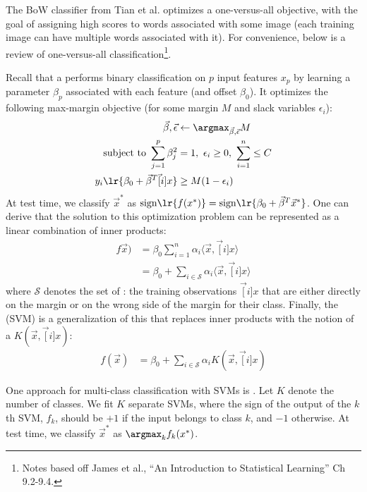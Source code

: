 \documentclass[11pt]{article}
\begin{document}
The BoW classifier from Tian et al. optimizes a one-versus-all objective, with the goal of assigning high scores to words associated with some image (each training image can have multiple words associated with it). For convenience, below is a review of one-versus-all classification\footnote{Notes based off James et al., ``An Introduction to Statistical Learning'' Ch 9.2-9.4.}.
\begin{example}
	Recall that a  performs binary classification on $p$ input features $x_p$ by learning a parameter $\beta_p$ associated with each feature (and offset $\beta_0$). It optimizes the following max-margin objective (for some margin $M$ and slack variables $\epsilon_i$):
	\begin{align}
		\vec{\beta}, \vec{\epsilon}
		&\leftarrow \argmax_{\vec \beta, \vec \epsilon} M \\
		\text{subject to } \sum_{j=1}^{p} \beta_j^2
		&= 1
		,~ \epsilon_i \geq 0
		,~ \sum_{i=1}^{n} \leq C \\
		y_i \lr{ \beta_0 + \vec{\beta}^T\vec[i]{x} }
		&\geq M(1 - \epsilon_i)
	\end{align}
	At test time, we classify $\vec{x}^*$ as $\text{sign} \lr{ f(x^*) } = \text{sign}\lr{ \beta_0 + \vec{\beta}^T \vec{x}^*}$. One can derive that the solution to this optimization problem can be represented as a linear combination of inner products:
	\begin{align}
		f\vec x) 
		&= \beta_0 \sum_{i=1}^{n} \alpha_i \langle \vec x, \vec[i]{x} \rangle  \\
		&= \beta_0 + \sum_{i \in \mathcal S} \alpha_i \langle \vec x, \vec[i]{x} \rangle
	\end{align}
	where $\mathcal S$ denotes the set of : the training observations $\vec[i]{x}$ that are either directly on the margin or on the wrong side of the margin for their class. Finally, the  (SVM) is a generalization of this that replaces inner products with the notion of a  $K(\vec x, \vec[i]{x})$:
	\begin{align}
		f(\vec x) 
		&= \beta_0 + \sum_{i \in \mathcal S} \alpha_i K(\vec x, \vec[i]{x})
	\end{align} 
	
	
	One approach for multi-class classification with SVMs is . Let $K$ denote the number of classes. We fit $K$ separate SVMs, where the sign of the output of the $k$th SVM, $f_k$, should be $+1$ if the input belongs to class $k$, and $-1$ otherwise. At test time, we classify $\vec{x}^*$ as $\argmax_k f_k(x^*)$. 
\end{example}
\end{document}
